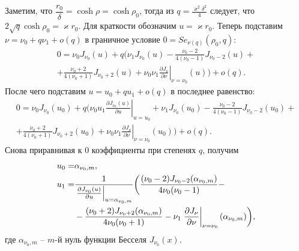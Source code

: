 Заметим, что $\dfrac{r_0}{\delta} = \cosh \rho = \cosh \rho_0 $, тогда из  $q = \frac{\varkappa^2 \delta^2}{4}$ следует, что $2\sqrt{q} \cosh{\rho_0} =   \varkappa r_0$. 
Для краткости обозначим $u = \varkappa r_0$. Теперь подставим  
$\nu=\nu_0 + q\nu_1 + o(q)$ в граничное условие $0 = Se_{\nu(q)}(\rho_0, q)$:
\begin{multline*}
0 = \nu_0 J_{\nu_0}(u) + q \bigg(  \nu_1 J_{\nu_0}(u) 
- \frac{\nu_0 - 2}{4(\nu_0-1)} J_{\nu_0-2}(u) + %
\\ %
+ \frac{\nu_0 + 2}{4(\nu_0+1)} J_{\nu_0+2}(u) +
 \nu_0 \nu_1 \left.\frac{\partial J_\nu}{\partial \nu}\right|_{\nu = \nu_0}(u)
\bigg) + o(q).
\end{multline*}
После чего подставим   $u = u_0 + q u_1 + o(q)$ в последнее равенство:
\begin{multline*}
0 = \nu_0 J_{\nu_0}(u_0) + q \bigg( 
\nu_0 u_1 \left.\frac{\partial J_{\nu_0}(u)}{\partial u}\right|_{u=u_0} 
+\nu_1 J_{\nu_0}(u_0) - \frac{\nu_0 - 2}{4(\nu_0-1)} J_{\nu_0-2}(u_0) +\\ 
+\frac{\nu_0 + 2}{4(\nu_0+1)} J_{\nu_0+2}(u_0) 
+ \nu_0 \nu_1 \left.\frac{\partial J_\nu}{\partial \nu}\right|_{\nu = \nu_0}(u_0)
\bigg) + o(q).
\end{multline*}
Снова приравнивая к $0$ коэффициенты при степенях  $q$, получим
\begin{align}
    u_0 =& \alpha_{\nu_0, m}, \label{eq:u0}\\
    u_1 =& \frac{1}{\left.\frac{\partial J_{\nu_0}(u)}{\partial u}\right|_{u=\alpha_{\nu_0, m}} } \biggl(
\frac{(\nu_0 - 2)J_{\nu_0-2}(\alpha_{\nu_0, m}) }{4 \nu_0(\nu_0-1)} - \notag \\    
&{}- \frac{(\nu_0 + 2)J_{\nu_0+2}(\alpha_{\nu_0, m}) }{4 \nu_0(\nu_0+1)} - \nu_1 \left.\frac{\partial J_\nu}{\partial \nu}\right|_{\nu = \nu_0}(\alpha_{\nu_0, m})
    \biggr),\label{eq:u1}
\end{align}
где $\alpha_{\nu_0, m}$ --  $m$-й нуль функции Бесселя $J_{\nu_0}(x)$. 




